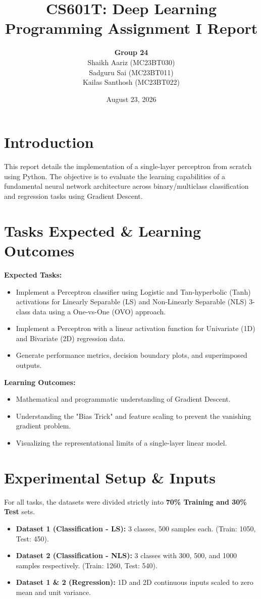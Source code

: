 \documentclass[12pt, a4paper]{article}
\title{\textbf{CS601T: Deep Learning} \\ \Large Programming Assignment I Report}
\author{\textbf{Group 24} \\ Shaikh Aariz (MC23BT030) \\ Sadguru Sai (MC23BT011) \\ Kailas Santhosh (MC23BT022)}
\date{August 23, 2026}
\begin{document}
\maketitle

\section{Introduction}
This report details the implementation of a single-layer perceptron from scratch using Python. The objective is to evaluate the learning capabilities of a fundamental neural network architecture across binary/multiclass classification and regression tasks using Gradient Descent.

\section{Tasks Expected \& Learning Outcomes}
\textbf{Expected Tasks:}
\begin{itemize}
    \item Implement a Perceptron classifier using Logistic and Tan-hyperbolic (Tanh) activations for Linearly Separable (LS) and Non-Linearly Separable (NLS) 3-class data using a One-vs-One (OVO) approach.
    \item Implement a Perceptron with a linear activation function for Univariate (1D) and Bivariate (2D) regression data.
    \item Generate performance metrics, decision boundary plots, and superimposed outputs.
\end{itemize}
\textbf{Learning Outcomes:}
\begin{itemize}
    \item Mathematical and programmatic understanding of Gradient Descent.
    \item Understanding the "Bias Trick" and feature scaling to prevent the vanishing gradient problem.
    \item Visualizing the representational limits of a single-layer linear model.
\end{itemize}

\section{Experimental Setup \& Inputs}
For all tasks, the datasets were divided strictly into \textbf{70\% Training and 30\% Test} sets.
\begin{itemize}
    \item \textbf{Dataset 1 (Classification - LS):} 3 classes, 500 samples each. (Train: 1050, Test: 450).
    \item \textbf{Dataset 2 (Classification - NLS):} 3 classes with 300, 500, and 1000 samples respectively. (Train: 1260, Test: 540).
    \item \textbf{Dataset 1 \& 2 (Regression):} 1D and 2D continuous inputs scaled to zero mean and unit variance.
\end{itemize}
\end{document}
